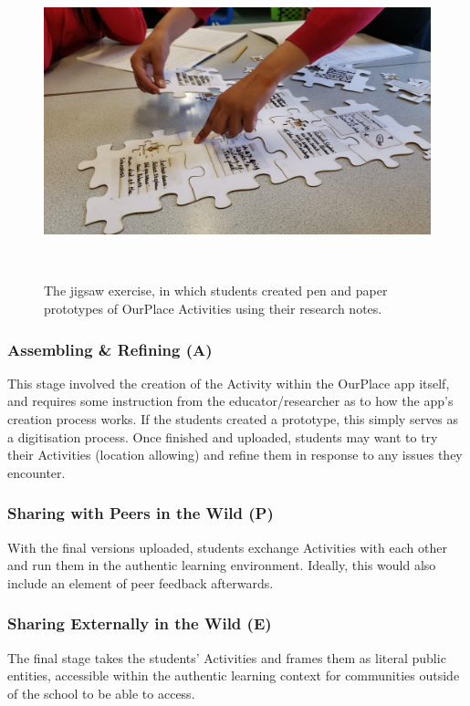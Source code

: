 \documentclass[,hyphens]{sigchi}
\begin{document}
\begin{figure}
\centering
  \includegraphics[width=1\columnwidth]{figures/jigsaw}
  \caption{The jigsaw exercise, in which students created pen and paper prototypes of OurPlace Activities using their research notes.}~\label{fig:Jigsaw}
\end{figure}

\subsubsection{Assembling \& Refining (A)}

This stage involved the creation of the Activity within the OurPlace app itself, and requires some instruction from the educator/researcher as to how the app's creation process works. If the students created a prototype, this simply serves as a digitisation process. Once finished and uploaded, students may want to try their Activities (location allowing) and refine them in response to any issues they encounter.  

\subsubsection{Sharing with Peers in the Wild (P)}

With the final versions uploaded, students exchange Activities with each other and run them in the authentic learning environment. Ideally, this would also include an element of peer feedback afterwards.

\subsubsection{Sharing Externally in the Wild (E)}

The final stage takes the students' Activities and frames them as literal public entities, accessible within the authentic learning context for communities outside of the school to be able to access.
\end{document}
